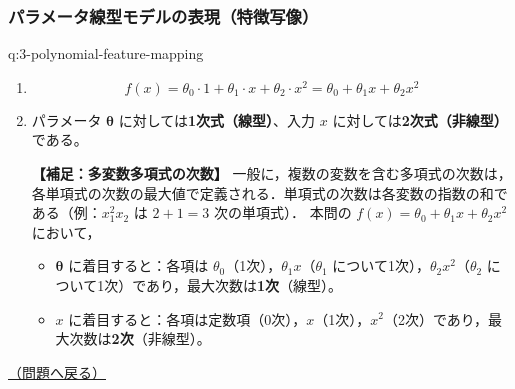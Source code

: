 \documentclass[
  pandoc]{bxjsarticle}
\providecommand{\tightlist}{%
  \setlength{\itemsep}{0pt}\setlength{\parskip}{0pt}}
\begin{document}
\subsubsection{パラメータ線型モデルの表現（特徴写像）}\label{ux30d1ux30e9ux30e1ux30fcux30bfux7ddaux578bux30e2ux30c7ux30ebux306eux8868ux73feux7279ux5fb4ux5199ux50cf-1}

\begin{answerbox}[phantomlabel=a:3-polynomial-feature-mapping]{q:3-polynomial-feature-mapping}

\begin{enumerate}
\def\labelenumi{\arabic{enumi}.}
\item
  \[f(x) = \theta_0 \cdot 1 + \theta_1 \cdot x + \theta_2 \cdot x^2 = \theta_0 + \theta_1 x + \theta_2 x^2\]
\item
  パラメータ \(\boldsymbol{\theta}\)
  に対しては\textbf{1次式（線型）}、入力 \(x\)
  に対しては\textbf{2次式（非線型）}である。

  \textbf{【補足：多変数多項式の次数】}
  一般に，複数の変数を含む多項式の次数は，各単項式の次数の最大値で定義される．単項式の次数は各変数の指数の和である（例：\(x_1^2 x_2\)
  は \(2+1=3\) 次の単項式）． 本問の
  \(f(x) = \theta_0 + \theta_1 x + \theta_2 x^2\) において，

  \begin{itemize}
  \tightlist
  \item
    \(\boldsymbol{\theta}\) に着目すると：各項は
    \(\theta_0\)（1次），\(\theta_1 x\)（\(\theta_1\)
    について1次），\(\theta_2 x^2\)（\(\theta_2\)
    について1次）であり，最大次数は\textbf{1次}（線型）。
  \item
    \(x\)
    に着目すると：各項は定数項（0次），\(x\)（1次），\(x^2\)（2次）であり，最大次数は\textbf{2次}（非線型）。
  \end{itemize}
\end{enumerate}

\hfill 

\hyperref[q:3-polynomial-feature-mapping]{（問題へ戻る）}

\end{answerbox}
\end{document}
